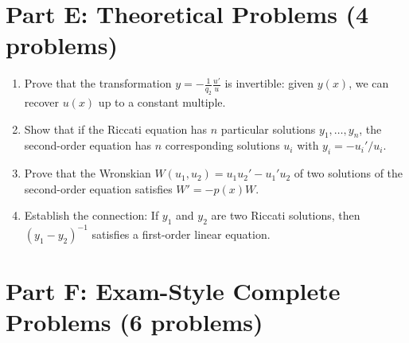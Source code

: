 \documentclass[12pt]{article}
\begin{document}
\section*{Part E: Theoretical Problems (4 problems)}

\begin{enumerate}[resume]
    \item Prove that the transformation $y = -\frac{1}{q_2}\frac{u'}{u}$ is invertible: given $y(x)$, we can recover $u(x)$ up to a constant multiple.

    \item Show that if the Riccati equation has $n$ particular solutions $y_1, \ldots, y_n$, the second-order equation has $n$ corresponding solutions $u_i$ with $y_i = -u_i'/u_i$.

    \item Prove that the Wronskian $W(u_1, u_2) = u_1u_2' - u_1'u_2$ of two solutions of the second-order equation satisfies $W' = -p(x)W$.

    \item Establish the connection: If $y_1$ and $y_2$ are two Riccati solutions, then $(y_1 - y_2)^{-1}$ satisfies a first-order linear equation.
\end{enumerate}

\section*{Part F: Exam-Style Complete Problems (6 problems)}
\end{document}
